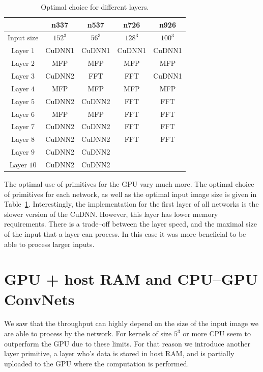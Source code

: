 \documentclass[conference]{./IEEEtran/IEEEtran}
\begin{document}
  \begin{table}
    \centering
    \begin{tabular}{ccccc}
      \toprule
      & n337    & n537  &  n726  &  n926 \\
      \midrule
      Input size & $152^3$ &  $56^3$  & $128^3$  & $100^3$ \\
      \midrule
      Layer $1$  &  CuDNN1  &  CuDNN1  & CuDNN1   & CuDNN1  \\
      Layer $2$  &  MFP     &  MFP     & MFP      & MFP     \\
      Layer $3$  &  CuDNN2  &  FFT     & FFT      & CuDNN1  \\
      Layer $4$  &  MFP     &  MFP     & MFP      & MFP     \\
      Layer $5$  &  CuDNN2  &  CuDNN2  & FFT      & FFT     \\
      Layer $6$  &  MFP     &  MFP     & FFT      & FFT     \\
      Layer $7$  &  CuDNN2  &  CuDNN2  & FFT      & FFT     \\
      Layer $8$  &  CuDNN2  &  CuDNN2  & FFT      & FFT     \\
      Layer $9$  &  CuDNN2  &  CuDNN2  & & \\
      Layer $10$ &  CuDNN2  &  CuDNN2  & & \\
      \bottomrule
    \end{tabular}
    \caption{Optimal choice for different layers.}
    \label{table:gpu_optimal}
  \end{table}



  The optimal use of primitives for the GPU vary much more.  The
  optimal choice of primitives for each network, as well as the
  optimal input image size is given in Table~\ref{table:gpu_optimal}.
  Interestingly, the implementation for the first layer of all
  networks is the slower version of the CuDNN.  However, this layer
  has lower memory requirements.  There is a trade--off between the
  layer speed, and the maximal size of the input that a layer can
  process.  In this case it was more beneficial to be able to process
  larger inputs.


\section{GPU + host RAM and CPU--GPU ConvNets}

  We saw that the throughput can highly depend on the size of the
  input image we are able to process by the network.  For kernels of
  size $5^3$ or more CPU seem to outperform the GPU due to these
  limits.  For that reason we introduce another layer primitive, a
  layer who's data is stored in host RAM, and is partially uploaded to
  the GPU where the computation is performed.
\end{document}
